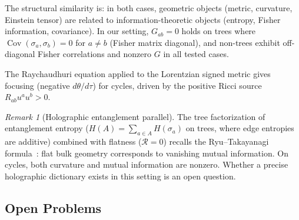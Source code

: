 \documentclass[11pt]{article}
\theoremstyle{definition}
\theoremstyle{remark}
\newtheorem{remark}[theorem]{Remark}
\newcommand{\obs}{u}
\newcommand{\Cov}{\operatorname{Cov}}
\newcommand{\edgeo}{\sigma}
\newcommand{\Ein}{G}
\newcommand{\Ric}{R}
\newcommand{\Scal}{\mathcal{R}}
\newcommand{\expan}{\theta}
\begin{document}
The structural similarity is: in both cases, geometric objects
(metric, curvature, Einstein tensor) are related to information-theoretic
objects (entropy, Fisher information, covariance).
In our setting, $\Ein_{ab} = 0$
holds on trees where $\Cov(\edgeo_a, \edgeo_b) = 0$ for $a \neq b$
(Fisher matrix diagonal), and non-trees exhibit off-diagonal Fisher
correlations and nonzero $\Ein$ in all tested cases.

The Raychaudhuri equation applied to the Lorentzian signed metric gives
focusing (negative $d\expan/d\tau$) for cycles, driven by the
positive Ricci source $\Ric_{ab}\obs^a\obs^b > 0$.

\begin{remark}[Holographic entanglement parallel]
The tree factorization of entanglement entropy
($H(A) = \sum_{a \in A} H(\edgeo_a)$ on trees, where edge entropies
are additive) combined with flatness ($\Scal = 0$) recalls the
Ryu--Takayanagi formula~\cite{RyuTakayanagi2006}: flat bulk geometry
corresponds to vanishing mutual information.
On cycles, both curvature and mutual information are nonzero.
Whether a precise holographic dictionary exists in this setting
is an open question.
\end{remark}

\subsection{Open Problems}
\end{document}
